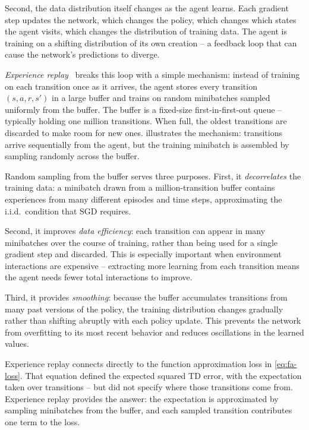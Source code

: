 \smallskip
Second, the data distribution itself changes as the agent learns.
Each gradient step updates the network, which changes the policy,
which changes which states the agent visits, which changes the
distribution of training data. The agent is training on a shifting
distribution of its own creation -- a feedback loop that can cause
the network's predictions to diverge.

\smallskip
\emph{Experience replay}~\citep{lin1992self,mnih2013playing} breaks
this loop with a simple mechanism: instead of training on each
transition once as it arrives, the agent stores every transition
$(s, a, r, s')$ in a large buffer and trains on random minibatches
sampled uniformly from the buffer. The buffer is a fixed-size
first-in-first-out queue -- typically holding one million transitions.
When full, the oldest transitions are discarded to make room for
new ones.  illustrates the mechanism:
transitions arrive sequentially from the agent, but the training
minibatch is assembled by sampling randomly across the buffer.



\smallskip
Random sampling from the buffer serves three purposes. First, it
\emph{decorrelates} the training data: a minibatch drawn from a
million-transition buffer contains experiences from many different
episodes and time steps, approximating the i.i.d.\ condition that
SGD requires.

\smallskip
Second, it improves \emph{data efficiency}: each transition can
appear in many minibatches over the course of training, rather than
being used for a single gradient step and discarded. This is
especially important when environment interactions are expensive --
extracting more learning from each transition means the agent needs
fewer total interactions to improve.

\smallskip
Third, it provides \emph{smoothing}: because the buffer accumulates
transitions from many past versions of the policy, the training
distribution changes gradually rather than shifting abruptly with
each policy update. This prevents the network from overfitting to
its most recent behavior and reduces oscillations in the learned
values.

\smallskip
Experience replay connects directly to the function approximation
loss in \cref{eq:fa-loss}. That equation defined the expected
squared TD error, with the expectation taken over transitions --
but did not specify where those transitions come from. Experience
replay provides the answer: the expectation is approximated by
sampling minibatches from the buffer, and each sampled transition
contributes one term to the loss.

